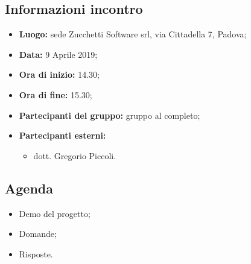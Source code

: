 \subsection{Informazioni incontro}
\begin{itemize}
	\item { \textbf{Luogo:} sede Zucchetti Software srl, via Cittadella 7, Padova;}
	\item { \textbf{Data:} 9 Aprile 2019};
	\item { \textbf{Ora di inizio:} 14.30};
	\item { \textbf{Ora di fine:} 15.30};
	\item { \textbf{Partecipanti del gruppo:} gruppo al completo};
	\item { \textbf{Partecipanti esterni:} 
	\begin{itemize}
			\item dott. Gregorio Piccoli.
	\end{itemize}}
\end{itemize}


\subsection{Agenda}
\begin{itemize}
	\item {Demo del progetto;}
	\item {Domande;}
	\item {Risposte.}
\end{itemize}

